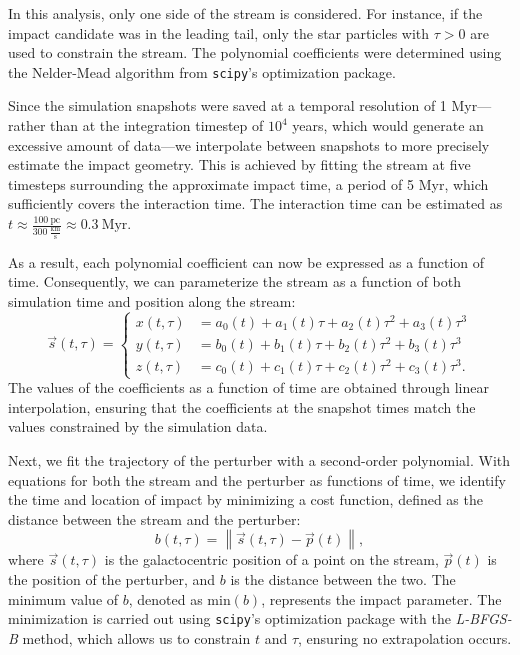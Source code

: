 \documentclass[draft]{aa}
\begin{document}
    In this analysis, only one side of the stream is considered. For instance, if the impact candidate was in the leading tail, only the star particles with $\tau > 0$ are used to constrain the stream. The polynomial coefficients were determined using the Nelder-Mead algorithm from \texttt{scipy}'s optimization package.

    Since the simulation snapshots were saved at a temporal resolution of 1 Myr—rather than at the integration timestep of $10^4$ years, which would generate an excessive amount of data—we interpolate between snapshots to more precisely estimate the impact geometry. This is achieved by fitting the stream at five timesteps surrounding the approximate impact time, a period of 5 Myr, which sufficiently covers the interaction time. The interaction time can be estimated as $t \approx \frac{100~\text{pc}}{300~\frac{\text{km}}{\text{s}}} \approx 0.3~\text{Myr}$.

    As a result, each polynomial coefficient can now be expressed as a function of time. Consequently, we can parameterize the stream as a function of both simulation time and position along the stream:
    \begin{equation}
      \vec{s}(t,\tau) = 
      \left\{
      \begin{aligned}
        x(t,\tau) &= a_0(t) + a_1(t)\tau + a_2(t) \tau^2 + a_3(t)\tau^3 \\ 
        y(t,\tau) &= b_0(t) + b_1(t)\tau + b_2(t) \tau^2 + b_3(t)\tau^3 \\
        z(t,\tau) &= c_0(t) + c_1(t)\tau + c_2(t) \tau^2 + c_3(t)\tau^3.
        \end{aligned}
      \right.
    \end{equation}
    The values of the coefficients as a function of time are obtained through linear interpolation, ensuring that the coefficients at the snapshot times match the values constrained by the simulation data.

    Next, we fit the trajectory of the perturber with a second-order polynomial. With equations for both the stream and the perturber as functions of time, we identify the time and location of impact by minimizing a cost function, defined as the distance between the stream and the perturber:
    \begin{equation} 
      b(t, \tau) = \left\lVert \vec{s}(t, \tau) - \vec{p}(t) \right\rVert, 
      \end{equation}
    where $\vec{s}(t, \tau)$ is the galactocentric position of a point on the stream, $\vec{p}(t)$ is the position of the perturber, and $b$ is the distance between the two. The minimum value of $b$, denoted as $\text{min}(b)$, represents the impact parameter. The minimization is carried out using \texttt{scipy}'s optimization package with the \textit{L-BFGS-B} method, which allows us to constrain $t$ and $\tau$, ensuring no extrapolation occurs.
\end{document}
